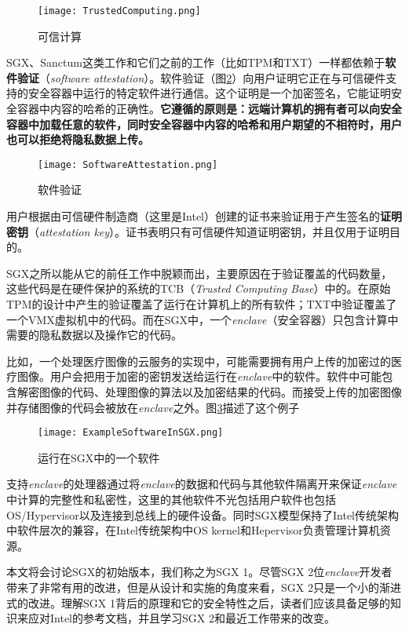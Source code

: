 \begin{figure}
\centering
\texttt{[image: TrustedComputing.png]}
\caption{可信计算}
\label{TrustedComputing}
\end{figure}

SGX、Sanctum这类工作和它们之前的工作（比如TPM和TXT）一样都依赖于\textbf{软件验证}（\textit{software attestation}）。软件验证（图\ref{SoftwareAttestation}）向用户证明它正在与可信硬件支持的安全容器中运行的特定软件进行通信。这个证明是一个加密签名，它能证明安全容器中内容的哈希的正确性。\textbf{它遵循的原则是：远端计算机的拥有者可以向安全容器中加载任意的软件，同时安全容器中内容的哈希和用户期望的不相符时，用户也可以拒绝将隐私数据上传。}

\begin{figure}
\centering
\texttt{[image: SoftwareAttestation.png]}
\caption{软件验证}
\label{SoftwareAttestation}
\end{figure}

用户根据由可信硬件制造商（这里是Intel）创建的证书来验证用于产生签名的\textbf{证明密钥}（\textit{attestation key}）。证书表明只有可信硬件知道证明密钥，并且仅用于证明目的。

SGX之所以能从它的前任工作中脱颖而出，主要原因在于验证覆盖的代码数量，这些代码是在硬件保护的系统的TCB（\textit{Trusted Computing Base}）中的。在原始TPM的设计中产生的验证覆盖了运行在计算机上的所有软件；TXT中验证覆盖了一个VMX虚拟机中的代码。而在SGX中，一个\textit{enclave}（安全容器）只包含计算中需要的隐私数据以及操作它的代码。

比如，一个处理医疗图像的云服务的实现中，可能需要拥有用户上传的加密过的医疗图像。用户会把用于加密的密钥发送给运行在\textit{enclave}中的软件。软件中可能包含解密图像的代码、处理图像的算法以及加密结果的代码。而接受上传的加密图像并存储图像的代码会被放在\textit{enclave}之外。图\ref{ExampleSoftwareInSGX}描述了这个例子

\begin{figure}
\centering
\texttt{[image: ExampleSoftwareInSGX.png]}
\caption{运行在SGX中的一个软件}
\label{ExampleSoftwareInSGX}
\end{figure}

支持\textit{enclave}的处理器通过将\textit{enclave}的数据和代码与其他软件隔离开来保证\textit{enclave}中计算的完整性和私密性，这里的其他软件不光包括用户软件也包括OS/Hypervisor以及连接到总线上的硬件设备。同时SGX模型保持了Intel传统架构中软件层次的兼容，在Intel传统架构中OS kernel和Hepervisor负责管理计算机资源。

本文将会讨论SGX的初始版本，我们称之为SGX 1。尽管SGX 2位\textit{enclave}开发者带来了非常有用的改进，但是从设计和实施的角度来看，SGX 2只是一个小的渐进式的改进。理解SGX 1背后的原理和它的安全特性之后，读者们应该具备足够的知识来应对Intel的参考文档，并且学习SGX 2和最近工作带来的改变。

